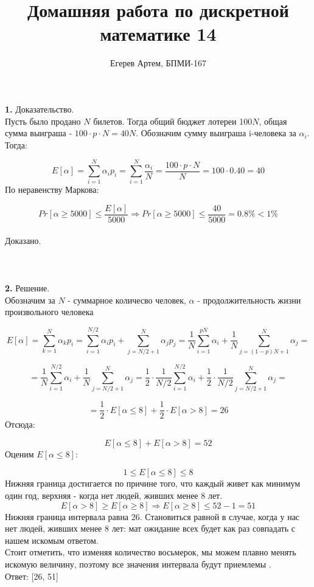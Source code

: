 \documentclass[12pt,a4paper]{scrartcl}
\title{Домашняя работа по дискретной математике 14}
\author{Егерев Артем, БПМИ-167}
\begin{document}
\maketitle

\noindent \textbf{1.}
Доказательство.\\
Пусть было продано $N$ билетов. Тогда общий бюджет лотереи 100$N$, общая сумма выиграша - $100 \cdot p \cdot N = 40N$. Обозначим сумму выиграша i-человека за $\alpha_i$. Тогда:

$$
E[\alpha] 
=\sum\limits_{i = 1}^N \alpha_i p_i 
= \sum\limits_{i = 1}^N \frac{\alpha_i}{N} = 
\frac{100\cdot p \cdot N }{N} 
= 100 \cdot 0.40 
= 40
$$
По неравенству Маркова:

$$
Pr[\alpha \geq 5000] \leq \frac{{E[\alpha]}}{5000} 
\Rightarrow  Pr[\alpha \geq 5000] \leq \frac{40}{5000} 
= 0.8\% < 1\%
$$
\\Доказано.
\\ \\ \\ \\




\noindent \textbf{2.}
Решение.\\
Обозначим за $N$ - суммарное количесво человек, $\alpha$ - продолжительность жизни произвольного человека

$$
E[ \alpha] 
= \sum_{k = 1}^{N} \alpha_k p_i 
= \sum_{i = 1}^{N/2} \alpha_i p_i +\sum_{j = N/2 + 1}^{N} \alpha_j p_j 
= \frac{1}{N} \sum_{i = 1}^{pN} \alpha_i +\frac{1}{N} \sum_{j = (1 - p)N + 1}^{N} \alpha_j 
=
$$

$$
= \frac{1}{N} \sum_{i = 1}^{N/2} \alpha_i +\frac{1}{N} \sum_{j = N/2 + 1}^{N} \alpha_j  
= \frac{1}{2} \cdot \frac{1}{N/2} \sum_{i = 1}^{N/2} \alpha_i + \frac{1}{2} \cdot \frac{1}{N/2} \sum_{j = N/2 + 1}^{N} \alpha_j 
=
$$

$$
= \frac{1}{2} \cdot E[\alpha \leq 8] + \frac{1}{2} \cdot E[\alpha > 8] = 26 
$$
Отсюда:

$$
E[\alpha \leq 8] + E[\alpha > 8] 
= 52
$$
Оценим  $E[\alpha \leq 8]$:

$$
1 \leq E[\alpha \leq 8] \leq 8
$$
Нижняя граница достигается по причине того, что каждый живет как минимум  один год,
верхняя - когда нет людей, живших  менее 8 лет.\\

$$
E[ \alpha > 8] \geq E[\alpha \geq 8] \Rightarrow E[\alpha \geq 8] \leq 52 - 1 
= 51
$$
Нижняя граница интервала равна 26. Становиться равной в случае, когда у нас нет людей, живших  менее 8 лет: мат ожидание  всех будет как раз совпадать с нашем  искомым  ответом.\\
Стоит отметить, что изменяя количество восьмерок, мы можем  плавно менять искомую величину, поэтому все значения интервала будут приемлемы .
\\Ответ: [26, 51] 
\\ \\ \\ \\
\end{document}
